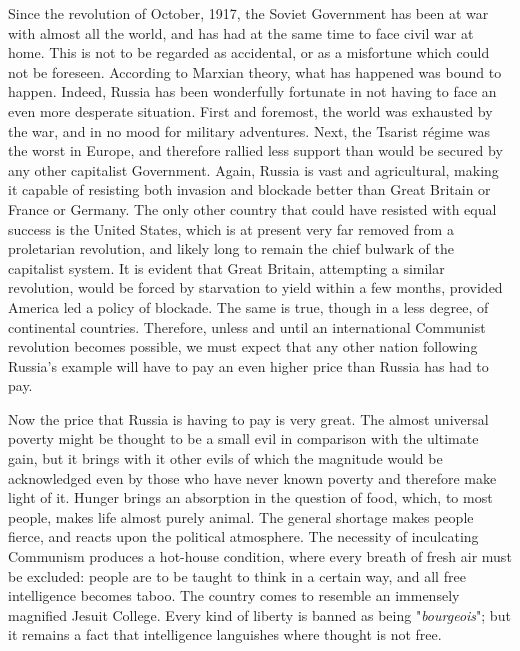 Since the revolution of October, 1917, the Soviet Government has been at war with almost all the world, and has had at the same time to face civil war at home. This is not to be regarded as accidental, or as a misfortune which could not be foreseen. According to Marxian theory, what has happened was bound to happen. Indeed, Russia has been wonderfully fortunate in not having to face an even more desperate situation. First and foremost, the world was exhausted by the war, and in no mood for military adventures. Next, the Tsarist régime was the worst in Europe, and therefore rallied less support than would be secured by any other capitalist Government. Again, Russia is vast and agricultural, making it capable of resisting both invasion and blockade better than Great Britain or France or Germany. The only other country that could have resisted with equal success is the United States, which is at present very far removed from a proletarian revolution, and likely long to remain the chief bulwark of the capitalist system. It is evident that Great Britain, attempting a similar revolution, would be forced by starvation to yield within a few months, provided America led a policy of blockade. The same is true, though in a less degree, of continental countries. Therefore, unless and until an international Communist revolution becomes possible, we must expect that any other nation following Russia's example will have to pay an even higher price than Russia has had to pay.

Now the price that Russia is having to pay is very great. The almost universal poverty might be thought to be a small evil in comparison with the ultimate gain, but it brings with it other evils of which the magnitude would be acknowledged even by those who have never known poverty and therefore make light of it. Hunger brings an absorption in the question of food, which, to most people, makes life almost purely animal. The general shortage makes people fierce, and reacts upon the political atmosphere. The necessity of inculcating Communism produces a hot-house condition, where every breath of fresh air must be excluded: people are to be taught to think in a certain way, and all free intelligence becomes taboo. The country comes to resemble an immensely magnified Jesuit College. Every kind of liberty is banned as being "\emph{bourgeois}"; but it remains a fact that intelligence languishes where thought is not free.

